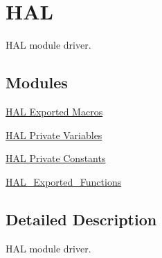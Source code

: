 \hypertarget{group___h_a_l}{}\section{H\+AL}
\label{group___h_a_l}


H\+AL module driver.  


\subsection*{Modules}
\begin{DoxyCompactItemize}
\item 
\hyperlink{group___h_a_l___exported___macros}{H\+A\+L Exported Macros}
\item 
\hyperlink{group___h_a_l___private___variables}{H\+A\+L Private Variables}
\item 
\hyperlink{group___h_a_l___private___constants}{H\+A\+L Private Constants}
\item 
\hyperlink{group___h_a_l___exported___functions}{H\+A\+L\+\_\+\+Exported\+\_\+\+Functions}
\end{DoxyCompactItemize}


\subsection{Detailed Description}
H\+AL module driver. 


